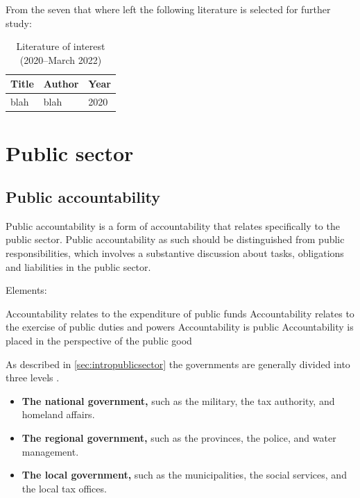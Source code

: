 From the seven that where left the following literature is selected for further study:

\begin{table}[H]
	\centering
	\begin{tabular}{p{}p{}p{}}
		\toprule%
		\textbf{Title} & \textbf{Author} & \textbf{Year} \\
		\midrule %
		blah & blah & 2020 \\%
		\bottomrule
	\end{tabular}
	\caption[Literature of interest (2020--March 2022)]{Literature of interest (2020--March 2022)}
	\label{tab:literatureafter2020}
\end{table}

\section{Public sector}
\label{sec:tbpublicsector}


\subsection{Public accountability}

Public accountability is a form of accountability that relates specifically to the public sector. Public accountability as such should be distinguished from public responsibilities, which involves a substantive discussion about tasks, obligations and liabilities in the public sector.

Elements:

Accountability relates to the expenditure of public funds
Accountability relates to the exercise of public duties and powers
Accountability is public
Accountability is placed in the perspective of the public good


As described in \cref{sec:intropublicsector}  the governments are generally divided into three levels \parencite{PrivacySense2016}.

\begin{itemize}
	\item{\textbf{The national government,} such as the military, the tax authority, and homeland affairs.}
	\item{\textbf{The regional government,} such as the provinces, the police, and water management.}
	\item{\textbf{The local government,} such as the municipalities, the social services, and the local tax offices.}
\end{itemize}

